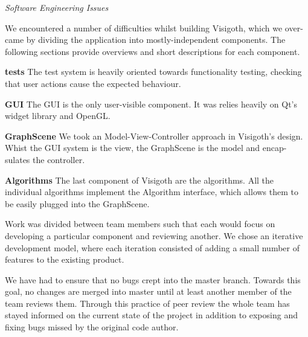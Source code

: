 \documentclass[a4paper,11pt,titlepage]{article}
\begin{document}
\begin{description}
	\item \emph{Software Engineering Issues}

We encountered a number of difficulties whilst building Visigoth, which we 
over- came by dividing the application into mostly-independent components.
The following sections provide overviews and short descriptions for each component.

\begin{description}
\item \textbf{tests}
The test system is heavily oriented towards functionality testing, checking that user actions cause the expected behaviour.
\item \textbf{GUI}
The GUI is the only user-visible component. It was relies heavily on Qt's widget library and OpenGL.
\item \textbf{GraphScene}
We took an Model-View-Controller approach in Visigoth's design. Whist the GUI system is the view, the GraphScene is the model and encap- sulates the controller.
\item \textbf{Algorithms}
The last component of Visigoth are the algorithms. All the individual algorithms implement the Algorithm interface, which allows them to be easily plugged into the GraphScene.
\end{description}

Work was divided between team members such that each would focus on developing
a particular component and reviewing another. We chose an iterative development 
model, where each iteration consisted of adding a small number of features to the
existing product.

We have had to ensure that no bugs crept into the master branch. Towards this 
goal, no changes are merged into master until at least another member of the 
team reviews them. Through this practice of peer review the whole team has stayed
informed on the current state of the project in addition to exposing and fixing 
bugs missed by the original code author. 


\end{description}
\end{document}
